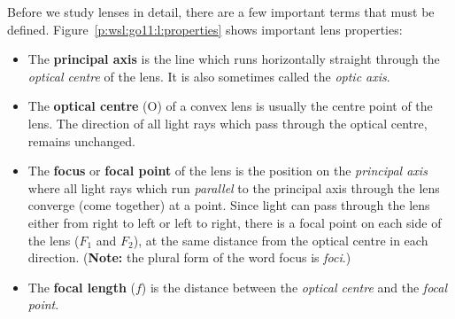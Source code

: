 Before we study lenses in detail, there are a few important terms that must be defined. Figure~\ref{p:wsl:go11:l:properties} shows important lens properties:
\begin{itemize}[noitemsep]
\item{The \textbf{principal axis} is the line which runs horizontally straight through the \textit{optical centre} of the lens. It is also sometimes called the \textit{optic axis}.}
\item{The \textbf{optical centre} (O) of a convex lens is usually the centre point of the lens. The direction of all light rays which pass through the optical centre, remains unchanged.}
\item{The \textbf{focus} or \textbf{focal point} of the lens is
the position on the \textit{principal axis}
where all light rays which run \textit{parallel} to the principal axis through the lens converge (come together) at a point. Since light can pass through the lens either from right to left or left to right, there is a focal point on each side of the lens ($F_{1}$ and $F_{2}$), at the same distance from the optical centre in each direction. (\textbf{Note:} the plural form of the word focus is \textit{foci}.)}
\item{The \textbf{focal length} ($f$) is the distance between the \textit{optical centre} and the \textit{focal point}.}
\end{itemize}

